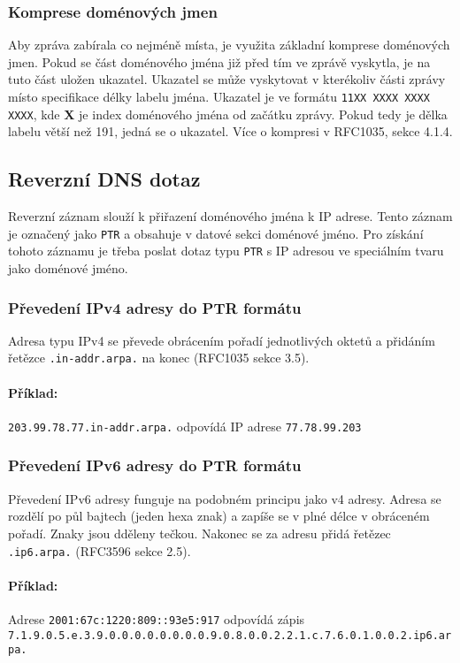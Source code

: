 \documentclass[a4paper,12pt]{article}
\begin{document}
\subsubsection{Komprese doménových jmen}
Aby zpráva zabírala co nejméně místa, je využita základní komprese doménových jmen. Pokud se část doménového jména již před tím ve zprávě vyskytla, je na tuto část uložen ukazatel. Ukazatel se může vyskytovat v kterékoliv části zprávy místo specifikace délky labelu jména. Ukazatel je ve formátu \texttt{11XX XXXX XXXX XXXX}, kde \textbf{X} je index doménového jména od začátku zprávy. Pokud tedy je dělka labelu větší než 191, jedná se o ukazatel. Více o kompresi v RFC1035, sekce 4.1.4.

\subsection{Reverzní DNS dotaz}
Reverzní záznam slouží k přiřazení doménového jména k IP adrese. Tento záznam je označený jako \texttt{PTR} a obsahuje v datové sekci doménové jméno.
Pro získání tohoto záznamu je třeba poslat dotaz typu \texttt{PTR} s IP adresou ve speciálním tvaru jako doménové jméno.
\newpage
\subsubsection{Převedení IPv4 adresy do PTR formátu}
Adresa typu IPv4 se převede obrácením pořadí jednotlivých oktetů a přidáním řetězce \texttt{.in-addr.arpa.} na konec (RFC1035 sekce 3.5).
\paragraph{Příklad:}\texttt{203.99.78.77.in-addr.arpa.} odpovídá IP adrese \texttt{77.78.99.203}

\subsubsection{Převedení IPv6 adresy do PTR formátu}
Převedení IPv6 adresy funguje na podobném principu jako v4 adresy. Adresa se rozdělí po půl bajtech (jeden hexa znak) a zapíše se v plné délce v obráceném pořadí. Znaky jsou dděleny tečkou. Nakonec se za adresu přidá řetězec \texttt{.ip6.arpa.} (RFC3596 sekce 2.5).
\paragraph{Příklad:}Adrese \texttt{2001:67c:1220:809::93e5:917} odpovídá zápis \texttt{7.1.9.0.5.e.3\linebreak .9.0.0.0.0.0.0.0.0.9.0.8.0.0.2.2.1.c.7.6.0.1.0.0.2.ip6.arpa.}
\end{document}
